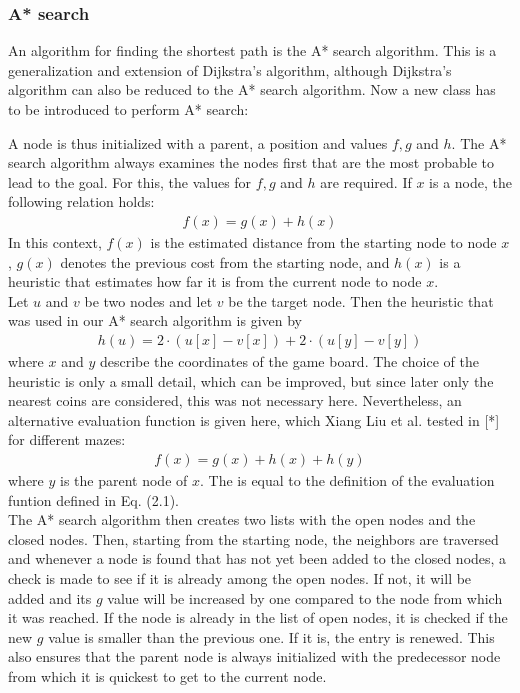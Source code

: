 \subsubsection*{A* search}
An algorithm for finding the shortest path is the A* search algorithm. This is a generalization and extension of Dijkstra's algorithm, although Dijkstra's algorithm can also be reduced to the A* search algorithm. Now a new class has to be introduced to perform A* search:
\vspace{0.1cm}

\vspace{0.1cm}
A node is thus initialized with a parent, a position and values $f,g$ and $h$. The A* search algorithm always examines the nodes first that are the most probable to lead to the goal. For this, the values for $f,g$ and $h$ are required. If $x$ is a node, the following relation holds:
\begin{align}
f(x) = g(x) + h(x)
\end{align}
In this context, $f(x)$ is the estimated distance from the starting node to node $x$, $g(x)$ denotes the previous cost from the starting node, and $h(x)$ is a heuristic that estimates how far it is from the current node to node $x$.
\\
 
Let $u$ and $v$ be two nodes and let $v$ be the target node. Then the heuristic that was used in our A* search algorithm is given by
\begin{align*}
h(u) = 2\cdot(u[x] - v[x]) + 2\cdot(u[y]-v[y])
\end{align*}
where $x$ and $y$ describe the coordinates of the game board. The choice of the heuristic is only a small detail, which can be improved, but since later only the nearest coins are considered, this was not necessary here. Nevertheless, an alternative evaluation function is given here, which Xiang Liu et al. tested in [*] for different mazes:
\begin{align*}
f(x) = g(x)+h(x)+h(y)
\end{align*}
where $y$ is the parent node of $x$. The is equal to the definition of the evaluation funtion defined in Eq. (2.1).
\\

The A* search algorithm then creates two lists with the open nodes and the closed nodes. Then, starting from the starting node, the neighbors are traversed and whenever a node is found that has not yet been added to the closed nodes, a check is made to see if it is already among the open nodes. If not, it will be added and its $g$ value will be increased by one compared to the node from which it was reached. If the node is already in the list of open nodes, it is checked if the new $g$ value is smaller than the previous one. If it is, the entry is renewed. This also ensures that the parent node is always initialized with the predecessor node from which it is quickest to get to the current node.
\\

